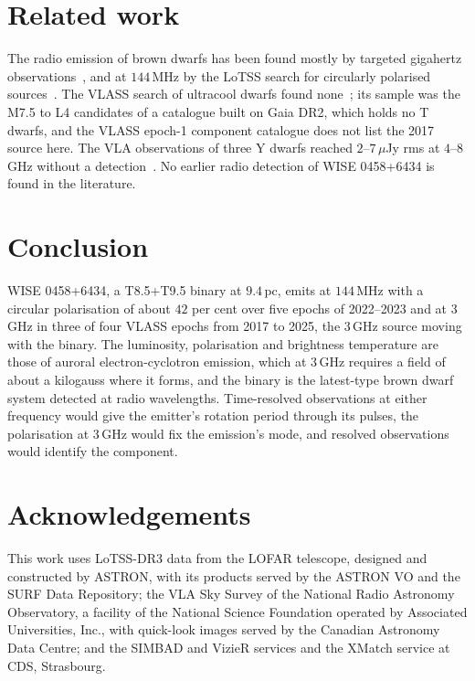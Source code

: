 \documentclass[3p,11pt]{elsarticle}
\begin{document}
\section{Related work}\label{sec:related}

The radio emission of brown dwarfs has been found mostly by targeted gigahertz
observations~\cite{RouteWolszczan2012,Kao2016,Rose2023}, and at $144$\,MHz by the LoTSS
search for circularly polarised sources~\cite{Vedantham2020,Vedantham2023,Callingham2023}.
The VLASS search of ultracool dwarfs found none~\cite{Perger2025}; its sample was the
M7.5 to L4 candidates of a catalogue built on Gaia DR2, which holds no T dwarfs, and the
VLASS epoch-1 component catalogue does not list the 2017 source here. The VLA observations of three
Y dwarfs reached $2$--$7$\,$\mu$Jy rms at $4$--$8$\,GHz without a
detection~\cite{Kao2019}. No earlier radio detection of WISE 0458+6434 is found in the
literature.

\section{Conclusion}\label{sec:conclusion}

WISE 0458+6434, a T8.5+T9.5 binary at $9.4$\,pc, emits at $144$\,MHz with a circular
polarisation of about $42$ per cent over five epochs of 2022--2023 and at $3$\,GHz in
three of four VLASS epochs from 2017 to 2025, the $3$\,GHz source moving with the binary.
The luminosity, polarisation and brightness temperature are those of auroral
electron-cyclotron emission, which at $3$\,GHz requires a field of about a kilogauss
where it forms, and the binary is the latest-type brown dwarf system detected at radio
wavelengths. Time-resolved observations at either frequency would give the emitter's
rotation period through its pulses, the polarisation at $3$\,GHz would fix the
emission's mode, and resolved observations would identify the component.

\section*{Acknowledgements}

This work uses LoTSS-DR3 data from the LOFAR telescope, designed and constructed by
ASTRON, with its products served by the ASTRON VO and the SURF Data Repository; the VLA
Sky Survey of the National Radio Astronomy Observatory, a facility of the National
Science Foundation operated by Associated Universities, Inc., with quick-look images
served by the Canadian Astronomy Data Centre; and the SIMBAD and VizieR services and the
XMatch service at CDS, Strasbourg.
\end{document}

